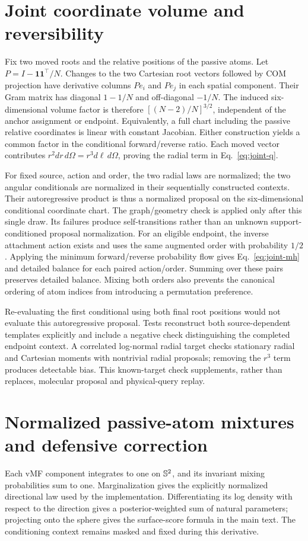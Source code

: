 \section{Joint coordinate volume and reversibility}
Fix two moved roots and the relative positions of the passive atoms. Let
$P=I-\mathbf 1\mathbf 1^\top/N$. Changes to the two Cartesian root vectors followed
by COM projection have derivative columns $Pe_i$ and $Pe_j$ in each spatial
component. Their Gram matrix has diagonal $1-1/N$ and off-diagonal $-1/N$.
The induced six-dimensional volume factor is therefore
$[(N-2)/N]^{3/2}$, independent of the anchor assignment or endpoint. Equivalently,
a full chart including the passive relative coordinates is linear with constant
Jacobian. Either construction yields a common factor in the conditional
forward/reverse ratio. Each moved vector contributes
$r^2 dr\,d\Omega=r^3 d\ell\,d\Omega$, proving the radial term in
Eq.~\eqref{eq:joint-q}.

For fixed source, action and order, the two radial laws are normalized; the two
angular conditionals are normalized in their sequentially constructed contexts.
Their autoregressive product is thus a normalized proposal on the six-dimensional
conditional coordinate chart. The graph/geometry check is applied only after this
single draw. Its failures produce self-transitions rather than an unknown
support-conditioned proposal normalization. For an eligible endpoint, the inverse
attachment action exists and uses the same augmented order with probability $1/2$.
Applying the minimum forward/reverse probability flow gives
Eq.~\eqref{eq:joint-mh} and detailed balance for each paired action/order. Summing
over these pairs preserves detailed balance. Mixing both orders also prevents
the canonical ordering of atom indices from introducing a permutation preference.

Re-evaluating the first conditional using both final root positions would not
evaluate this autoregressive proposal. Tests reconstruct both source-dependent
templates explicitly and include a negative check distinguishing the completed
endpoint context. A correlated log-normal radial target checks stationary radial
and Cartesian moments with nontrivial radial proposals; removing the $r^3$ term
produces detectable bias. This known-target check supplements, rather than
replaces, molecular proposal and physical-query replay.

\section{Normalized passive-atom mixtures and defensive correction}
Each vMF component integrates to one on $\mathbb S^2$, and its invariant mixing
probabilities sum to one. Marginalization gives the explicitly normalized
directional law used by the implementation. Differentiating its log density with
respect to the direction gives a posterior-weighted sum of natural parameters;
projecting onto the sphere gives the surface-score formula in the main text.
The conditioning context remains masked and fixed during this derivative.


